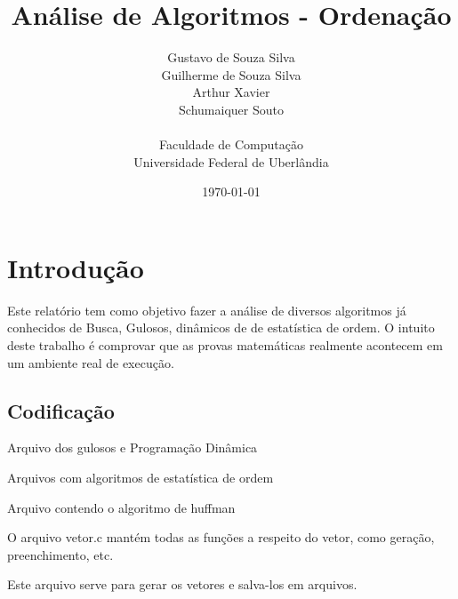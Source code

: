 \documentclass[12pt,a4paper,twoside]{report}
\title{Análise de Algoritmos - Ordenação}
\date{}
\author{Gustavo de Souza Silva \\ Guilherme de Souza Silva \\ Arthur Xavier \\ Schumaiquer Souto \\
\vspace{1cm} \\
Faculdade de Computação \\
Universidade Federal de Uberlândia
}
\date{\today}
\begin{document}
  \maketitle
\listoffigures            
\listoftables            
\lstlistoflistings

\tableofcontents    


\fancyhead[RE,LO]{\thesection}

\setlength{\parskip}{0.15in} %

\chapter{Introdução}
Este relatório tem como objetivo fazer a análise de diversos algoritmos já conhecidos de Busca, Gulosos, dinâmicos de de estatística de ordem. O intuito deste trabalho é comprovar que as provas matemáticas realmente acontecem em um ambiente real de execução.

\section{Codificação}
Arquivo dos gulosos e Programação Dinâmica


Arquivos com algoritmos de estatística de ordem


Arquivo contendo o algoritmo de huffman


O arquivo vetor.c mantém todas as funções a respeito do vetor, como geração, preenchimento, etc.


Este arquivo serve para gerar os vetores e salva-los em arquivos.

\end{document}
